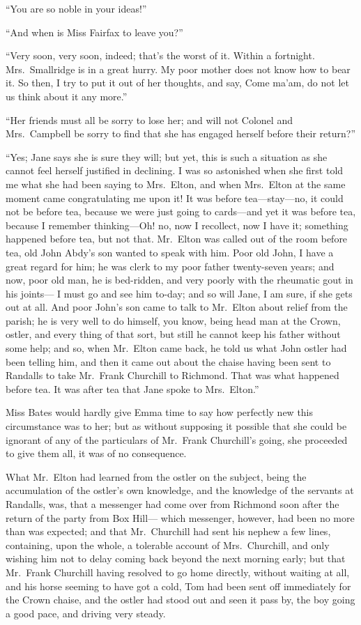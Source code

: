 ``You are so noble in your ideas!''

``And when is Miss Fairfax to leave you?''

``Very soon, very soon, indeed; that's the worst of it.
Within a fortnight.  Mrs.\ Smallridge is in a great hurry.  My poor
mother does not know how to bear it.  So then, I try to put it out of
her thoughts, and say, Come ma'am, do not let us think about it any more.''

``Her friends must all be sorry to lose her; and will not Colonel
and Mrs.\ Campbell be sorry to find that she has engaged herself
before their return?''

``Yes; Jane says she is sure they will; but yet, this is such
a situation as she cannot feel herself justified in declining.
I was so astonished when she first told me what she had been saying
to Mrs.\ Elton, and when Mrs.\ Elton at the same moment came congratulating
me upon it!  It was before tea---stay---no, it could not be before tea,
because we were just going to cards---and yet it was before tea,
because I remember thinking---Oh! no, now I recollect, now I have it;
something happened before tea, but not that.  Mr.\ Elton was called
out of the room before tea, old John Abdy's son wanted to speak
with him.  Poor old John, I have a great regard for him; he was clerk
to my poor father twenty-seven years; and now, poor old man, he is
bed-ridden, and very poorly with the rheumatic gout in his joints---%
I must go and see him to-day; and so will Jane, I am sure, if she
gets out at all.  And poor John's son came to talk to Mr.\ Elton
about relief from the parish; he is very well to do himself,
you know, being head man at the Crown, ostler, and every thing
of that sort, but still he cannot keep his father without some help;
and so, when Mr.\ Elton came back, he told us what John ostler
had been telling him, and then it came out about the chaise having
been sent to Randalls to take Mr.\ Frank Churchill to Richmond.
That was what happened before tea.  It was after tea that Jane spoke
to Mrs.\ Elton.''

Miss Bates would hardly give Emma time to say how perfectly
new this circumstance was to her; but as without supposing it
possible that she could be ignorant of any of the particulars
of Mr.\ Frank Churchill's going, she proceeded to give them all,
it was of no consequence.

What Mr.\ Elton had learned from the ostler on the subject, being the
accumulation of the ostler's own knowledge, and the knowledge
of the servants at Randalls, was, that a messenger had come over
from Richmond soon after the return of the party from Box Hill---%
which messenger, however, had been no more than was expected;
and that Mr.\ Churchill had sent his nephew a few lines, containing,
upon the whole, a tolerable account of Mrs.\ Churchill, and only
wishing him not to delay coming back beyond the next morning early;
but that Mr.\ Frank Churchill having resolved to go home directly,
without waiting at all, and his horse seeming to have got a cold,
Tom had been sent off immediately for the Crown chaise, and the
ostler had stood out and seen it pass by, the boy going a good pace,
and driving very steady.

